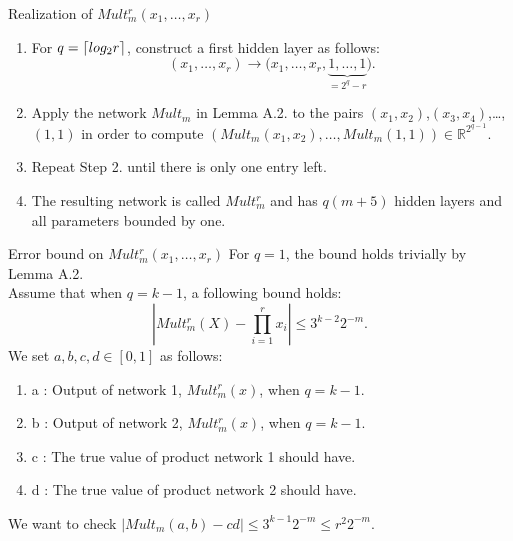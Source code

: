\documentclass{if-beamer}
\DeclarePairedDelimiter{\ceil}{\lceil}{\rceil}
\newcommand\STAR{\raisebox{-.7em}{\tikz{\node[draw,star,star point height=.7em,minimum size=1em]{};} }}
\begin{document}
\begin{frame}{Realization of $Mult_{m}^{r}(x_{1},\dots,x_{r})$}

\begin{enumerate}
    \item For $q=\ceil{log_{2}r}$, construct a first hidden layer as follows:
    \begin{equation*}
        (x_{1},\dots,x_{r})\rightarrow{\big(x_{1},\dots,x_{r},\underbrace{1,\dots,1}_{=2^{q}-r} \big)}.
    \end{equation*}
    \item Apply the network $Mult_m$ in Lemma A.2. to the pairs $(x_1,x_2)$,$(x_3,x_4)$,\dots,$(1,1)$ in order to compute $(Mult_m(x_{1},x_{2}),\dots,Mult_m(1,1))\in\mathbb{R}^{2^{q-1}}$.
    \item Repeat Step 2. until there is only one entry left.
    \item The resulting network is called $Mult_{m}^{r}$ and has $q(m+5)$ hidden layers and all parameters bounded by one.
\end{enumerate}

\end{frame}

\begin{frame}{Error bound on $Mult_{m}^{r}(x_{1},\dots,x_{r})$}
 For $q=1$, the bound holds trivially by Lemma A.2. \\
 Assume that when $q=k-1$, a following bound holds: 
    \begin{equation*}
        \left| Mult_m^{r}(X) - \prod_{i=1}^{r}x_{i} \right| \leq 3^{k-2}2^{-m}.
    \end{equation*}
 We set $a,b,c,d \in [0,1]$ as follows:
 \begin{enumerate}
     \item a : Output of network 1, $Mult_m^{r}(x)$, when $q=k-1$.
     \item b : Output of network 2, $Mult_m^{r}(x)$, when $q=k-1$.
     \item c : The true value of product network 1 should have.
     \item d : The true value of product network 2 should have.
 \end{enumerate}   
 
 \STAR We want to check $\left| Mult_{m}(a,b) - cd \right|\leq 3^{k-1}2^{-m}\leq r^{2}2^{-m}$.
 
\end{frame}
\end{document}
